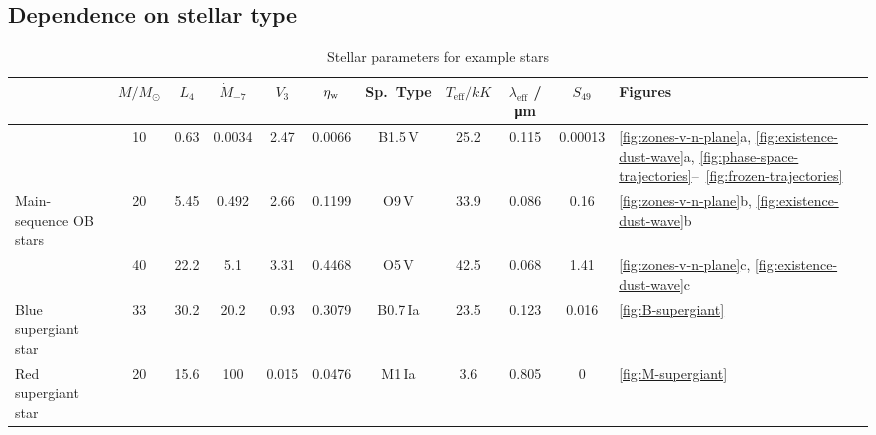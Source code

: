 \subsection{Dependence on stellar type}
\label{sec:depend-stell-type}

\begin{table}
  \centering
  \caption{Stellar parameters for example stars}
  \label{tab:stars}
  \begin{tabular}{l S S S S S S S S S l}
    \toprule
    & {\(M / \si{M_\odot}\)} & {\(L_4\)}
    & {\(\dot{M}_{-7}\)} & {\(V_3\)} & {\( \eta_{\text{w}} \)}
    & {Sp.~Type} 
    & {\(T_{\text{eff}} / \si{kK}\)} & {\(\lambda_{\text{eff}}\) / \si{\um}}
    & {\(S_{49}\)} & Figures 
    \\
    \midrule
    & 10 & 0.63 & 0.0034 & 2.47 & 0.0066 & {B1.5\,V} & 25.2 & 0.115 & 0.00013
                   & \ref{fig:zones-v-n-plane}a, \ref{fig:existence-dust-wave}a,
                     \ref{fig:phase-space-trajectories}--~\ref{fig:frozen-trajectories} \\
    Main-sequence OB stars
    & 20 & 5.45 & 0.492 & 2.66 & 0.1199 & {O9\,V} & 33.9 & 0.086 & 0.16
                   & \ref{fig:zones-v-n-plane}b, \ref{fig:existence-dust-wave}b \\
    & 40 & 22.2 & 5.1 & 3.31 & 0.4468 & {O5\,V} & 42.5 & 0.068 & 1.41
                   & \ref{fig:zones-v-n-plane}c, \ref{fig:existence-dust-wave}c \\[\smallskipamount]
    Blue supergiant star
    & 33 & 30.2 & 20.2 & 0.93 & 0.3079 & {B0.7\,Ia} & 23.5 & 0.123 & 0.016
                   & \ref{fig:B-supergiant} \\[\smallskipamount]
    Red supergiant star
    & 20 & 15.6 & 100 & 0.015 & 0.0476 & {M1\,Ia} & 3.6 & 0.805 & 0
                   & \ref{fig:M-supergiant} \\ 
    \bottomrule
  \end{tabular}
\end{table}


